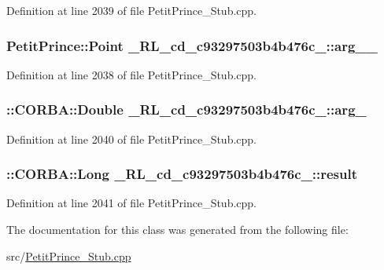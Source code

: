 Definition at line 2039 of file Petit\+Prince\+\_\+\+Stub.\+cpp.

\subsubsection[{\texorpdfstring{arg\+\_\+1\+\_\+}{arg_1_}}]{\setlength{\rightskip}{0pt plus 5cm}Petit\+Prince\+::\+Point \+\_\+R\+L\+\_\+cd\+\_\+c93297503b4b476c\+\_\+::arg\+\_\+\_\+}\hypertarget{class__0_r_l__cd__c93297503b4b476c__11000000_a36cb208c9c1152cddc301d382e4fec23}{}\label{class__0_r_l__cd__c93297503b4b476c__11000000_a36cb208c9c1152cddc301d382e4fec23}


Definition at line 2038 of file Petit\+Prince\+\_\+\+Stub.\+cpp.

\subsubsection[{\texorpdfstring{arg\+\_\+2}{arg_2}}]{\setlength{\rightskip}{0pt plus 5cm}\+::C\+O\+R\+B\+A\+::\+Double \+\_\+R\+L\+\_\+cd\+\_\+c93297503b4b476c\+\_\+::arg\+\_}\hypertarget{class__0_r_l__cd__c93297503b4b476c__11000000_a67084e7fa5c434110e588481b53a61c2}{}\label{class__0_r_l__cd__c93297503b4b476c__11000000_a67084e7fa5c434110e588481b53a61c2}


Definition at line 2040 of file Petit\+Prince\+\_\+\+Stub.\+cpp.

\subsubsection[{\texorpdfstring{result}{result}}]{\setlength{\rightskip}{0pt plus 5cm}\+::C\+O\+R\+B\+A\+::\+Long \+\_\+R\+L\+\_\+cd\+\_\+c93297503b4b476c\+\_\+::result}\hypertarget{class__0_r_l__cd__c93297503b4b476c__11000000_a5e87affab2cb58f2a874bb8572df0486}{}\label{class__0_r_l__cd__c93297503b4b476c__11000000_a5e87affab2cb58f2a874bb8572df0486}


Definition at line 2041 of file Petit\+Prince\+\_\+\+Stub.\+cpp.



The documentation for this class was generated from the following file\+:\begin{DoxyCompactItemize}
\item 
src/\hyperlink{_petit_prince___stub_8cpp}{Petit\+Prince\+\_\+\+Stub.\+cpp}\end{DoxyCompactItemize}
